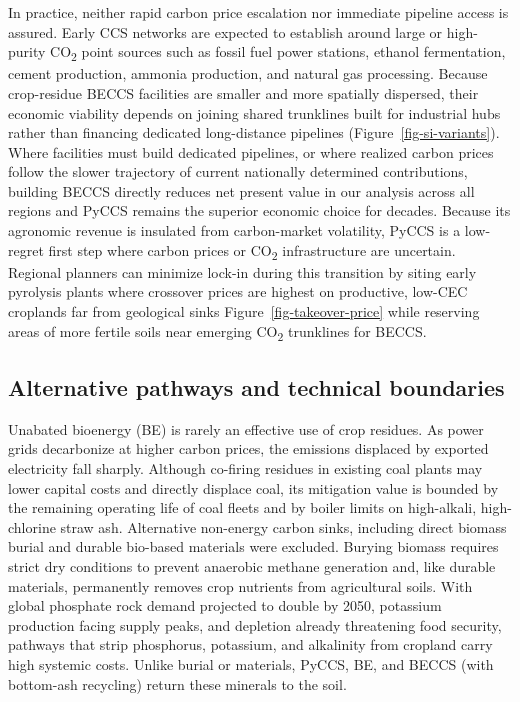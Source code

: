 \documentclass[
  letterpaper,
  twoside,
  twocolumn,
  9pt]{article}
\begin{document}
In practice, neither rapid carbon price escalation nor immediate
pipeline access is assured. Early CCS networks are expected to establish
around large or high-purity CO\textsubscript{2} point sources such as
fossil fuel power stations, ethanol fermentation, cement production,
ammonia production, and natural gas
processing.\citep{bains2017, sanchez2018} Because crop-residue BECCS
facilities are smaller and more spatially dispersed, their economic
viability depends on joining shared trunklines built for industrial hubs
rather than financing dedicated long-distance pipelines
(Figure~\ref{fig-si-variants}). Where facilities must build dedicated
pipelines, or where realized carbon prices follow the slower trajectory
\citep{ngfs2026} of current nationally determined contributions,
building BECCS directly reduces net present value in our analysis across
all regions and PyCCS remains the superior economic choice for decades.
Because its agronomic revenue is insulated from carbon-market
volatility, PyCCS is a low-regret first step where carbon prices or
CO\textsubscript{2} infrastructure are uncertain. Regional planners can
minimize lock-in during this transition by siting early pyrolysis plants
where crossover prices are highest on productive, low-CEC croplands far
from geological sinks Figure~\ref{fig-takeover-price} while reserving
areas of more fertile soils near emerging CO\textsubscript{2} trunklines
for BECCS.

\subsection{Alternative pathways and technical
boundaries}\label{alternative-pathways-and-technical-boundaries}

Unabated bioenergy (BE) is rarely an effective use of crop residues. As
power grids decarbonize at higher carbon prices, the emissions displaced
by exported electricity fall sharply. Although co-firing residues in
existing coal plants may lower capital costs and directly displace
coal,\citep{roni2017} its mitigation value is bounded by the remaining
operating life of coal fleets and by boiler limits on high-alkali,
high-chlorine straw ash. Alternative non-energy carbon sinks, including
direct biomass burial \citep{luo2025woody, clayton2026} and durable
bio-based materials were excluded. Burying biomass requires strict dry
conditions to prevent anaerobic methane generation
\citep{yablonovitch2023} and, like durable materials, permanently
removes crop nutrients from agricultural soils. With global phosphate
rock demand projected to double by 2050,\citep{nedelciu2020} potassium
production facing supply peaks,\citep{alrawashdeh2020} and depletion
already threatening food security,\citep{churkina2020} pathways that
strip phosphorus, potassium, and alkalinity from cropland carry high
systemic costs. Unlike burial or materials, PyCCS, BE, and BECCS (with
bottom-ash recycling) return these minerals to the soil.
\end{document}
